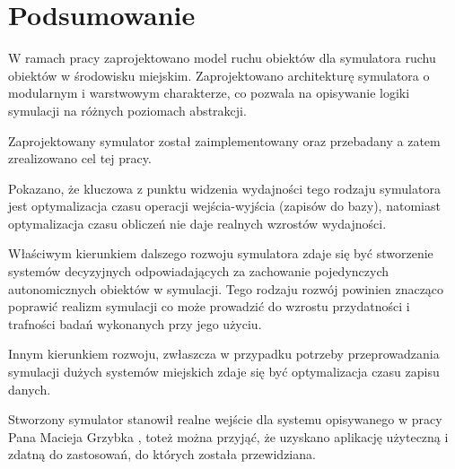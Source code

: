 \chapter{Podsumowanie}
\par{
W ramach pracy zaprojektowano model ruchu obiektów dla symulatora ruchu obiektów w środowisku miejskim. Zaprojektowano architekturę symulatora o modularnym i warstwowym charakterze, co pozwala na opisywanie logiki symulacji na różnych poziomach abstrakcji.
}
\par{
Zaprojektowany symulator został zaimplementowany oraz przebadany a zatem zrealizowano cel tej pracy.
}
\par{
Pokazano, że kluczowa z punktu widzenia wydajności tego rodzaju symulatora jest optymalizacja czasu operacji wejścia-wyjścia (zapisów do bazy), natomiast optymalizacja czasu obliczeń nie daje realnych wzrostów wydajności.
}
\par{
Właściwym kierunkiem dalszego rozwoju symulatora zdaje się być stworzenie systemów decyzyjnych odpowiadających za zachowanie pojedynczych autonomicznych obiektów w symulacji. Tego rodzaju rozwój powinien znacząco poprawić realizm symulacji co może prowadzić do wzrostu przydatności i trafności badań wykonanych przy jego użyciu.
}
\par{
Innym kierunkiem rozwoju, zwłaszcza w przypadku potrzeby przeprowadzania symulacji dużych systemów miejskich zdaje się być optymalizacja czasu zapisu danych.
}
\par{
Stworzony symulator stanowił realne wejście dla systemu opisywanego w pracy Pana Macieja Grzybka \cite{Grzybek}, toteż można przyjąć, że uzyskano aplikację użyteczną i zdatną do zastosowań, do których została przewidziana.
}